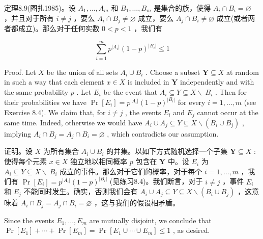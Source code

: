 \documentclass[10pt]{article}
\begin{document}
\begin{tcolorbox}\relax
定理8.9(图扎1985)。设 \({A}_{1},\ldots ,{A}_{m}\) 和 \({B}_{1},\ldots ,{B}_{m}\) 是集合的族，使得 \({A}_{i} \cap  {B}_{i} = \varnothing\) ，并且对于所有 \(i \neq  j\) ，要么 \({A}_{i} \cap  {B}_{j} \neq  \varnothing\) 成立，要么 \({A}_{j} \cap  {B}_{i} \neq  \varnothing\) 成立(或者两者都成立)。那么对于任何实数 \(0 < p < 1\) ，我们有
\end{tcolorbox}

\[
\mathop{\sum }\limits_{{i = 1}}^{m}{p}^{\left| {A}_{i}\right| }{\left( 1 - p\right) }^{\left| {B}_{i}\right| } \leq  1
\]

Proof. Let \(X\) be the union of all sets \({A}_{i} \cup  {B}_{i}\) . Choose a subset \(\mathbf{Y} \subseteq  X\) at random in such a way that each element \(x \in  X\) is included in \(\mathbf{Y}\) independently and with the same probability \(p\) . Let \({E}_{i}\) be the event that \({A}_{i} \subseteq  Y \subseteq  X \smallsetminus \; {B}_{i}\) . Then for their probabilities we have \(\Pr \left\lbrack  {E}_{i}\right\rbrack   = {p}^{\left| {A}_{i}\right| }{\left( 1 - p\right) }^{\left| {B}_{i}\right| }\) for every \(i = 1,\ldots ,m\) (see Exercise 8.4). We claim that, for \(i \neq  j\) , the events \({E}_{i}\) and \({E}_{j}\) cannot occur at the same time. Indeed, otherwise we would have \({A}_{i} \cup  {A}_{j} \subseteq  Y \subseteq  X \smallsetminus  \left( {{B}_{i} \cup  {B}_{j}}\right)\) , implying \({A}_{i} \cap  {B}_{j} = {A}_{j} \cap  {B}_{i} = \varnothing\) , which contradicts our assumption.

\begin{tcolorbox}\relax
证明。设 \(X\) 为所有集合 \({A}_{i} \cup  {B}_{i}\) 的并集。以如下方式随机选择一个子集 \(\mathbf{Y} \subseteq  X\) :使得每个元素 \(x \in  X\) 独立地以相同概率 \(p\) 包含在 \(\mathbf{Y}\) 中。设 \({E}_{i}\) 为 \({A}_{i} \subseteq  Y \subseteq  X \smallsetminus \; {B}_{i}\) 成立的事件。那么对于它们的概率，对于每个 \(i = 1,\ldots ,m\) ，我们有 \(\Pr \left\lbrack  {E}_{i}\right\rbrack   = {p}^{\left| {A}_{i}\right| }{\left( 1 - p\right) }^{\left| {B}_{i}\right| }\) (见练习8.4)。我们断言，对于 \(i \neq  j\) ，事件 \({E}_{i}\) 和 \({E}_{j}\) 不能同时发生。确实，否则我们会有 \({A}_{i} \cup  {A}_{j} \subseteq  Y \subseteq  X \smallsetminus  \left( {{B}_{i} \cup  {B}_{j}}\right)\) ，这意味着 \({A}_{i} \cap  {B}_{j} = {A}_{j} \cap  {B}_{i} = \varnothing\) ，这与我们的假设相矛盾。
\end{tcolorbox}

Since the events \({E}_{1},\ldots ,{E}_{m}\) are mutually disjoint, we conclude that \(\Pr \left\lbrack  {E}_{1}\right\rbrack   + \cdots  + \Pr \left\lbrack  {E}_{m}\right\rbrack   = \Pr \left\lbrack  {{E}_{1} \cup  \cdots  \cup  {E}_{m}}\right\rbrack   \leq  1\) , as desired.
\end{document}
